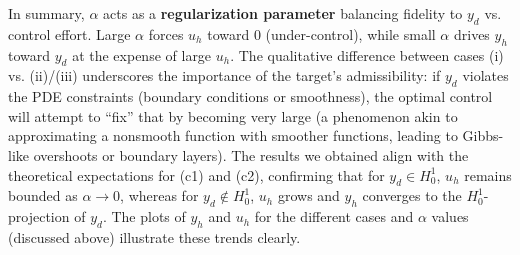 In summary, \(\alpha\) acts as a \textbf{regularization parameter} balancing fidelity to \(y_d\) vs. control effort.
Large \(\alpha\) forces \(u_h\) toward 0 (under-control), while small \(\alpha\) drives \(y_h\) toward \(y_d\) at the expense of large \(u_h\). The qualitative difference between cases (i) vs. (ii)/(iii) underscores the importance of the target's admissibility: if \(y_d\) violates the PDE constraints (boundary conditions or smoothness), the optimal control will attempt to “fix” that by becoming very large (a phenomenon akin to approximating a nonsmooth function with smoother functions, leading to Gibbs-like overshoots or boundary layers). The results we obtained align with the theoretical expectations for (c1) and (c2), confirming that for \(y_d\in H^1_0\), \(u_h\) remains bounded as \(\alpha\to 0\), whereas for \(y_d\notin H^1_0\), \(u_h\) grows and \(y_h\) converges to the \(H^1_0\)-projection of \(y_d\).
The plots of \(y_h\) and \(u_h\) for the different cases and \(\alpha\) values (discussed above) illustrate these trends clearly.

